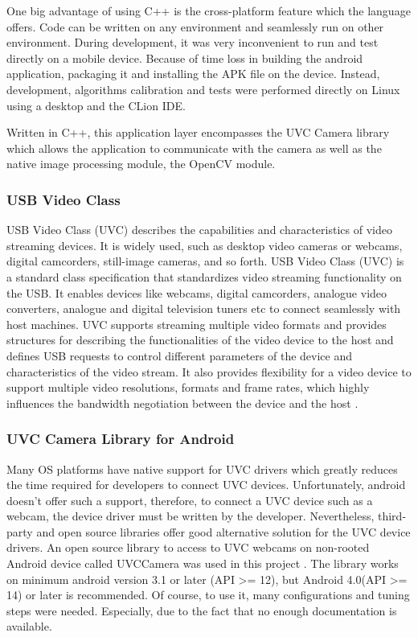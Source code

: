 One big advantage of using C++ is the cross-platform feature which the language offers. Code can be written on any environment and seamlessly run on other environment. During development, it was very inconvenient to run and test directly on a mobile device. Because of time loss in building the android application, packaging it and installing the APK file on the device. Instead, development, algorithms calibration and tests were performed directly on Linux using a desktop and the CLion IDE.

Written in C++, this application layer encompasses the UVC Camera library which allows the application to communicate with the camera as well as the native image processing module, the OpenCV module.



\subsubsection{USB Video Class}

USB Video Class (UVC) describes the capabilities and characteristics of video streaming devices. It is widely used, such as desktop video cameras or webcams, digital camcorders, still-image cameras, and so forth. USB Video Class (UVC) is a standard class specification that standardizes video streaming functionality on the USB. It enables devices like webcams, digital camcorders, analogue video converters, analogue and digital television tuners etc to connect seamlessly with host machines. UVC supports streaming multiple video formats and provides structures for describing the functionalities of the video device to the host and defines USB requests to control different parameters of the device and characteristics of the video stream. It also provides flexibility for a video device to support multiple video resolutions, formats and frame rates, which highly influences the bandwidth negotiation between the device and the host \parencite{uvc}.

\subsubsection{UVC Camera Library for Android}
Many OS platforms have native support for UVC drivers which greatly reduces the time required for developers to connect UVC devices. Unfortunately, android doesn’t offer such a support, therefore, to connect a UVC device such as a webcam, the device driver must be written by the developer. 
Nevertheless, third-party and open source libraries offer good alternative solution for the UVC device drivers. An open source library to access to UVC webcams on non-rooted Android device called UVCCamera was used in this project \parencite{uvcCamera}. The library works on minimum android version 3.1 or later (API >= 12), but Android 4.0(API >= 14) or later is recommended. Of course, to use it, many configurations and tuning steps were needed. Especially, due to the fact that no enough documentation is available.



